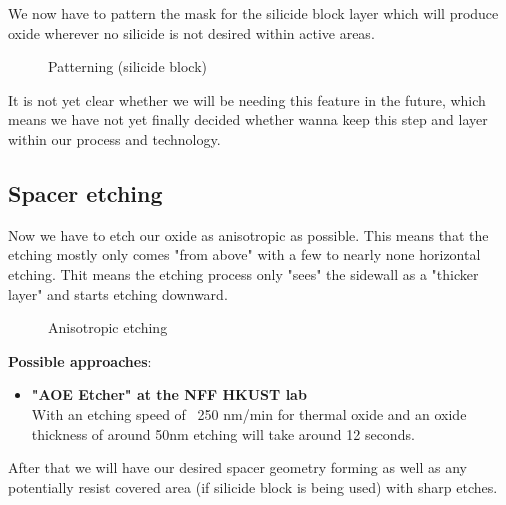 We now have to pattern the mask for the silicide block layer which will produce oxide wherever no silicide is not desired within active areas.

\begin{figure}[H]
	\centering
	\begin{tikzpicture}[node distance = 3cm, auto, thick,scale=\CrossSectionOnly, every node/.style={transform shape}]
		
	\end{tikzpicture}
	\begin{tikzpicture}[node distance = 3cm, auto, thick,scale=\CrossSectionOnly, every node/.style={transform shape}]
		
	\end{tikzpicture}
	\caption{Patterning (silicide block)}
\end{figure}

It is not yet clear whether we will be needing this feature in the future, which means we have not yet finally decided whether wanna keep this step and layer within our process and technology.

\newpage

\subsection{Spacer etching}

Now we have to etch our oxide as anisotropic as possible.
This means that the etching mostly only comes "from above" with a few to nearly none horizontal etching.
Thit means the etching process only "sees" the sidewall as a "thicker layer" and starts etching downward.
\begin{figure}[H]
	\centering
	\begin{tikzpicture}[node distance = 3cm, auto, thick,scale=\CrossSectionOnly, every node/.style={transform shape}]
		
	\end{tikzpicture}
	\begin{tikzpicture}[node distance = 3cm, auto, thick,scale=\CrossSectionOnly, every node/.style={transform shape}]
		
	\end{tikzpicture}
	\caption{Anisotropic etching}
\end{figure}

\textbf{Possible approaches}:
\begin{itemize}
	\item\textbf{"AOE Etcher" at the NFF HKUST lab}\\
	With an etching speed of ~250 nm/min for thermal oxide and an oxide thickness of around 50nm etching will take around 12 seconds.
\end{itemize}
After that we will have our desired spacer geometry forming as well as any potentially resist covered area (if silicide block is being used) with sharp etches.

